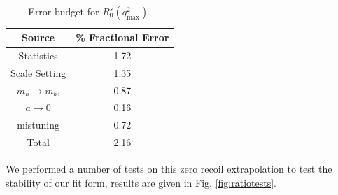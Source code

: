 \begin{table}[htb!]
  \begin{center}
    \begin{tabular}{c c}
      \hline
      Source & \% Fractional Error \\ [0.5ex]
      \hline
      Statistics & 1.72  \\ [1ex]
      Scale Setting & 1.35  \\ [1ex]
      $m_h \to m_b$, & 0.87  \\ [1ex]
      $a\to 0$ & 0.16  \\ [1ex]
      mistuning & 0.72 \\ [1ex]
      \hline
      Total & 2.16 \\ [1ex]
      \hline
    \end{tabular}
  \end{center}
  \caption{Error budget for $R_0^s(q^2_{\text{max}})$. \label{ratioq2max_budget}}
\end{table}

We performed a number of tests on this zero recoil extrapolation to test the stability of our fit form, results are given in Fig. \ref{fig:ratiotests}.

